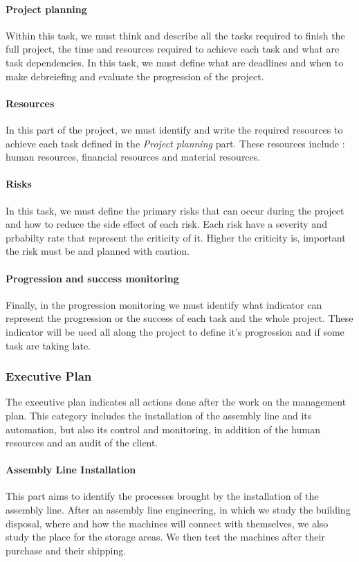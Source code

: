 \paragraph{Project planning} Within this task, we must think and describe all the tasks required to finish the full project, the time and resources required to achieve each task and what are task dependencies.
In this task, we must define what are deadlines and when to make debreiefing and evaluate the progression of the project.

\paragraph{Resources} In this part of the project, we must identify and write the required resources to achieve each task defined in the \emph{Project planning} part.
These resources include : human resources, financial resources and material resources.

\paragraph{Risks} In this task, we must define the primary risks that can occur during the project and how to reduce the side effect of each risk.
Each risk have a severity and prbabilty rate that represent the criticity of it.
Higher the criticity is, important the risk must be and planned with caution.

\paragraph{Progression and success monitoring} Finally, in the progression monitoring we must identify what indicator can represent the progression or the success of each task and the whole project.
These indicator will be used all along the project to define it's progression and if some task are taking late.

\subsubsection{Executive Plan}

The executive plan indicates all actions done after the work on the management plan. 
This category includes the installation of the assembly line and its automation, but also its control and monitoring, in addition of the human resources and an audit of the client.

\paragraph{Assembly Line Installation} This part aims to identify the processes brought by the installation of the assembly line. 
After an assembly line engineering, in which we study the building disposal, where and how the machines will connect with themselves, we also
study the place for the storage areas. 
We then test the machines after their purchase and their shipping. 

